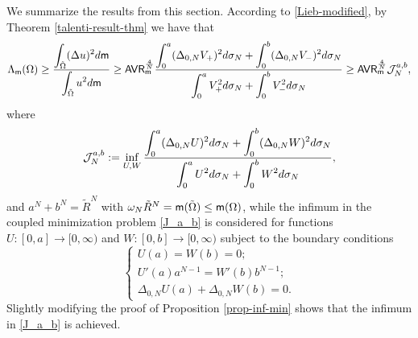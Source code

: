 \documentclass[11pt, reqno]{amsart}
\newcommand{\ds}{\displaystyle}
\numberwithin{equation}{section}
\begin{document}
		We summarize the results from this section. According to \eqref{Lieb-modified}, by Theorem \ref{talenti-result-thm} we have that
		\begin{equation}\label{Lieb-modified-final}
				\Lambda_{\sf m}(\Omega)\geq \frac{\displaystyle\int_{\tilde \Omega} (\Delta u)^2 {\rm d}{\sf m}}{\displaystyle\int_{\tilde \Omega} u^2 {\rm d}{\sf m}}\geq {\sf AVR}_ {\sf m}^\frac{4}{N}\frac{\displaystyle\int_{0}^a (\Delta_{0,N}V_+)^2{\rm d}\sigma_N+ \int_{0}^b (\Delta_{0,N}V_-)^2{\rm d}\sigma_N }{\displaystyle\int_{0}^aV_+^2 {\rm d}\sigma_N+\int_{0}^b V_-^2 {\rm d}\sigma_N}\geq {\sf AVR}_ {\sf m}^\frac{4}{N}\mathcal J^{a,b}_N,
		\end{equation}
		where 
		\begin{equation}\label{J_a_b}
			\mathcal J^{a,b}_N:=\inf_{U,W} \frac{\displaystyle\int_{0}^a (\Delta_{0,N}U)^2{\rm d}\sigma_N+ \int_{0}^b (\Delta_{0,N}W)^2{\rm d}\sigma_N }{\displaystyle\int_{0}^aU^2 {\rm d}\sigma_N+\int_{0}^b W^2 {\rm d}\sigma_N},
			\end{equation}
		and $a^N+b^N=\tilde R^N$ with $\omega_N\tilde R^N={\sf m}(\tilde \Omega)\leq {\sf m}(\Omega)$, while the infimum in the coupled minimization problem \eqref{J_a_b} is considered for functions 
		$U:[0,a]\to [0,\infty)$ and $W:[0,b]\to [0,\infty)$  subject to the boundary 
		conditions 
		\begin{equation}\label{BCs}
			\ds\left\{ \begin{array}{lll}
				U(a)=W(b)=0; \\
				U'(a)a^{N-1}=W'(b)b^{N-1};\\
				\Delta_{0,N}U(a)+\Delta_{0,N}W(b)=0.
			\end{array}\right.
		\end{equation}
		Slightly modifying the proof of Proposition \ref{prop-inf-min} shows that the infimum in \eqref{J_a_b} is achieved.  
		
\end{document}
